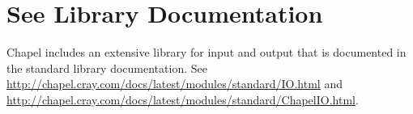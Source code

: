 \label{Input_and_Output}

\section{See Library Documentation}

Chapel includes an extensive library for input and output that is
documented in the standard library documentation. See
\url{http://chapel.cray.com/docs/latest/modules/standard/IO.html}
and
\url{http://chapel.cray.com/docs/latest/modules/standard/ChapelIO.html}.


